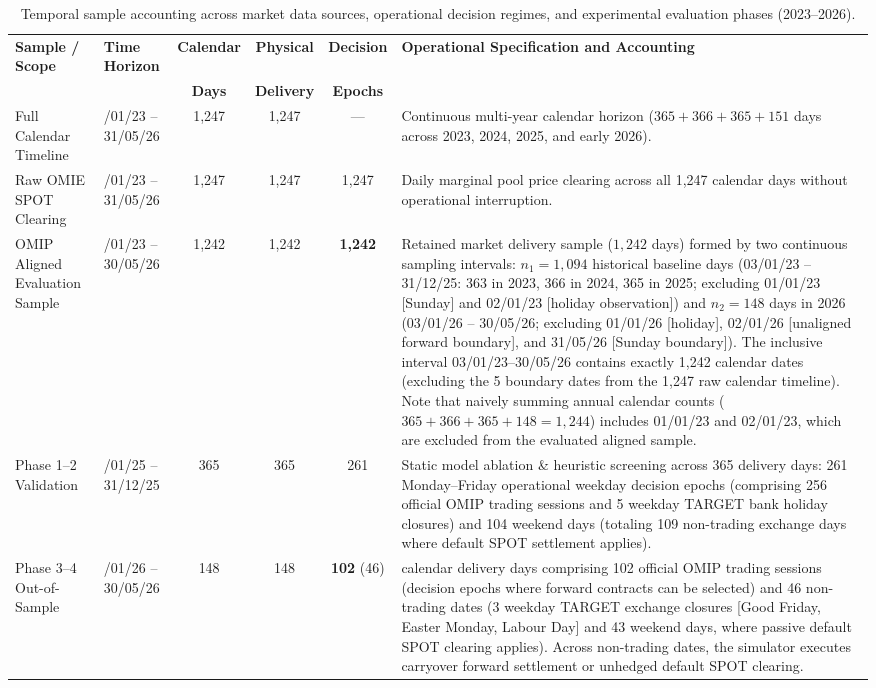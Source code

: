 \begin{table}[!t]
\bigskip

\caption{Temporal sample accounting across market data sources, operational decision regimes, and experimental evaluation phases (2023--2026).}
\label{tab:sample_accounting}
\setlength{\tabcolsep}{2.5pt}
\begin{tabularx}{\linewidth}{@{} >{\raggedright\arraybackslash}p{2.8cm} >{\centering\arraybackslash}p{2.3cm} ccc >{\raggedright\arraybackslash}X@{}}
\toprule
\textbf{Sample / Scope} & \textbf{Time Horizon} & \textbf{Calendar} & \textbf{Physical} & \textbf{Decision} & \textbf{Operational Specification and Accounting} \\
 & & \textbf{Days} & \textbf{Delivery} & \textbf{Epochs} & \\
\midrule
Full Calendar Timeline & 01/01/23 -- 31/05/26 & 1,247 & 1,247 & --- & Continuous multi-year calendar horizon ($365 + 366 + 365 + 151$ days across 2023, 2024, 2025, and early 2026). \\
Raw OMIE SPOT Clearing & 01/01/23 -- 31/05/26 & 1,247 & 1,247 & 1,247 & Daily marginal pool price clearing across all 1,247 calendar days without operational interruption. \\
OMIP Aligned Evaluation Sample & 03/01/23 -- 30/05/26 & 1,242 & 1,242 & \textbf{1,242} & Retained market delivery sample ($1{,}242$ days) formed by two continuous sampling intervals: $n_1 = 1{,}094$ historical baseline days (03/01/23 -- 31/12/25: 363 in 2023, 366 in 2024, 365 in 2025; excluding 01/01/23 [Sunday] and 02/01/23 [holiday observation]) and $n_2 = 148$ days in 2026 (03/01/26 -- 30/05/26; excluding 01/01/26 [holiday], 02/01/26 [unaligned forward boundary], and 31/05/26 [Sunday boundary]). The inclusive interval 03/01/23--30/05/26 contains exactly 1,242 calendar dates (excluding the 5 boundary dates from the 1,247 raw calendar timeline). Note that naively summing annual calendar counts ($365 + 366 + 365 + 148 = 1{,}244$) includes 01/01/23 and 02/01/23, which are excluded from the evaluated aligned sample. \\
\midrule
Phase 1--2 Validation & 01/01/25 -- 31/12/25 & 365 & 365 & 261 & Static model ablation \& heuristic screening across 365 delivery days: 261 Monday--Friday operational weekday decision epochs (comprising 256 official OMIP trading sessions and 5 weekday TARGET bank holiday closures) and 104 weekend days (totaling 109 non-trading exchange days where default SPOT settlement applies). \\
Phase 3--4 Out-of-Sample & 03/01/26 -- 30/05/26 & 148 & 148 & \textbf{102} (46) & 148 calendar delivery days comprising 102 official OMIP trading sessions (decision epochs where forward contracts can be selected) and 46 non-trading dates (3 weekday TARGET exchange closures [Good Friday, Easter Monday, Labour Day] and 43 weekend days, where passive default SPOT clearing applies). Across non-trading dates, the simulator executes carryover forward settlement or unhedged default SPOT clearing. \\

\end{tabularx}
\end{table}
